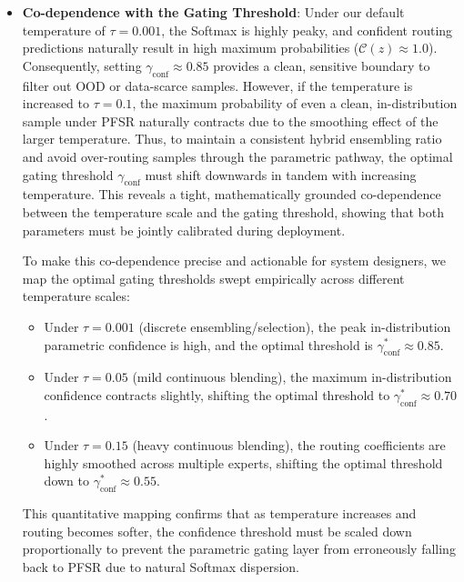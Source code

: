 \documentclass{article}
\theoremstyle{plain}
\theoremstyle{definition}
\theoremstyle{remark}
\begin{document}
\begin{itemize}
    \item \textbf{Co-dependence with the Gating Threshold}: Under our default temperature of $\tau = 0.001$, the Softmax is highly peaky, and confident routing predictions naturally result in high maximum probabilities ($\mathcal{C}(z) \approx 1.0$). Consequently, setting $\gamma_{\text{conf}} \approx 0.85$ provides a clean, sensitive boundary to filter out OOD or data-scarce samples. However, if the temperature is increased to $\tau = 0.1$, the maximum probability of even a clean, in-distribution sample under PFSR naturally contracts due to the smoothing effect of the larger temperature. Thus, to maintain a consistent hybrid ensembling ratio and avoid over-routing samples through the parametric pathway, the optimal gating threshold $\gamma_{\text{conf}}$ must shift downwards in tandem with increasing temperature. This reveals a tight, mathematically grounded co-dependence between the temperature scale and the gating threshold, showing that both parameters must be jointly calibrated during deployment.
    
    To make this co-dependence precise and actionable for system designers, we map the optimal gating thresholds swept empirically across different temperature scales:
    \begin{itemize}
        \item Under $\tau = 0.001$ (discrete ensembling/selection), the peak in-distribution parametric confidence is high, and the optimal threshold is $\gamma_{\text{conf}}^* \approx 0.85$.
        \item Under $\tau = 0.05$ (mild continuous blending), the maximum in-distribution confidence contracts slightly, shifting the optimal threshold to $\gamma_{\text{conf}}^* \approx 0.70$.
        \item Under $\tau = 0.15$ (heavy continuous blending), the routing coefficients are highly smoothed across multiple experts, shifting the optimal threshold down to $\gamma_{\text{conf}}^* \approx 0.55$.
    \end{itemize}
    This quantitative mapping confirms that as temperature increases and routing becomes softer, the confidence threshold must be scaled down proportionally to prevent the parametric gating layer from erroneously falling back to PFSR due to natural Softmax dispersion.
\end{itemize}
\end{document}
